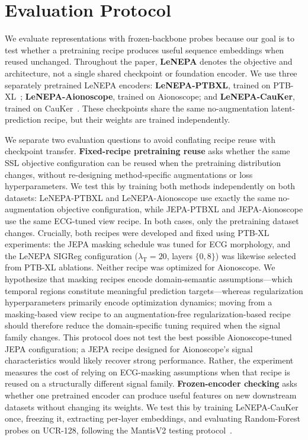 \documentclass[sigconf,anonymous,review]{acmart}
\begin{document}
\section{Evaluation Protocol}
\label{sec:evaluation_protocol}

We evaluate representations with frozen-backbone probes because our goal is to test whether a pretraining recipe produces useful sequence embeddings when reused unchanged.
Throughout the paper, \textbf{LeNEPA} denotes the objective and architecture, not a single shared checkpoint or foundation encoder.
We use three separately pretrained LeNEPA encoders: \textbf{LeNEPA-PTBXL}, trained on PTB-XL~\citep{wagner2020ptbxl}; \textbf{LeNEPA-Aionoscope}, trained on Aionoscope; and \textbf{LeNEPA-CauKer}, trained on CauKer~\citep{xie2025cauker}.
These checkpoints share the same no-augmentation latent-prediction recipe, but their weights are trained independently.

We separate two evaluation questions to avoid conflating recipe reuse with checkpoint transfer.
\textbf{Fixed-recipe pretraining reuse} asks whether the same SSL objective configuration can be reused when the pretraining distribution changes, without re-designing method-specific augmentations or loss hyperparameters.
We test this by training both methods independently on both datasets: LeNEPA-PTBXL and LeNEPA-Aionoscope use exactly the same no-augmentation objective configuration, while JEPA-PTBXL and JEPA-Aionoscope use the same ECG-tuned view recipe. In both cases, only the pretraining dataset changes.
Crucially, both recipes were developed and fixed using PTB-XL experiments: the JEPA masking schedule was tuned for ECG morphology, and the LeNEPA SIGReg configuration ($\lambda_{\mathrm{T}}=20$, layers $\{0,8\}$) was likewise selected from PTB-XL ablations.
Neither recipe was optimized for Aionoscope.
We hypothesize that masking recipes encode domain-semantic assumptions---which temporal regions constitute meaningful prediction targets---whereas regularization hyperparameters primarily encode optimization dynamics; moving from a masking-based view recipe to an augmentation-free regularization-based recipe should therefore reduce the domain-specific tuning required when the signal family changes.
This protocol does not test the best possible Aionoscope-tuned JEPA configuration; a JEPA recipe designed for Aionoscope's signal characteristics would likely recover strong performance. Rather, the experiment measures the cost of relying on ECG-masking assumptions when that recipe is reused on a structurally different signal family.
\textbf{Frozen-encoder checking} asks whether one pretrained encoder can produce useful features on new downstream datasets without changing its weights.
We test this by training LeNEPA-CauKer once, freezing it, extracting per-layer embeddings, and evaluating Random-Forest probes on UCR-128, following the MantisV2 testing protocol~\citep{feofanov2026mantisv2}.
\end{document}
